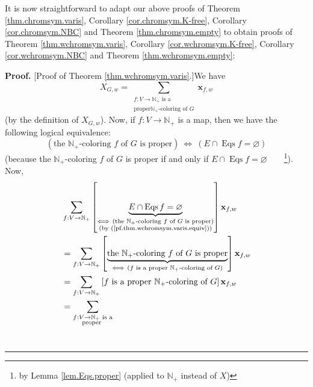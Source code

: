 \documentclass[numbers=enddot,12pt,final,onecolumn,notitlepage]{scrartcl}%
\theoremstyle{definition}
\newenvironment{proof}[1][Proof]{\noindent\textbf{#1.} }{\ \rule{0.5em}{0.5em}}
\newenvironment{verlong}{}{}
\let\sumnonlimits\sum
\renewcommand{\sum}{\sumnonlimits\limits}
\begin{document}
\begin{verlong}
It is now straightforward to adapt our above proofs of Theorem
\ref{thm.chromsym.varis}, Corollary \ref{cor.chromsym.K-free}, Corollary
\ref{cor.chromsym.NBC} and Theorem \ref{thm.chromsym.empty} to obtain proofs
of Theorem \ref{thm.wchromsym.varis}, Corollary \ref{cor.wchromsym.K-free},
Corollary \ref{cor.wchromsym.NBC} and Theorem \ref{thm.wchromsym.empty}:

\begin{proof}
[Proof of Theorem \ref{thm.wchromsym.varis}.]We have
\begin{equation}
X_{G,w}=\sum_{\substack{f:V\rightarrow\mathbb{N}_{+}\text{ is a}\\\text{proper
}\mathbb{N}_{+}\text{-coloring of }G}}\mathbf{x}_{f,w}
\label{pf.thm.wchromsym.varis.XG-def}%
\end{equation}
(by the definition of $X_{G,w}$). Now, if $f:V\rightarrow\mathbb{N}_{+}$ is a
map, then we have the following logical equivalence:%
\begin{equation}
\left(  \text{the }\mathbb{N}_{+}\text{-coloring }f\text{ of }G\text{ is
proper}\right)  \ \Longleftrightarrow\ \left(  E\cap\operatorname*{Eqs}%
f=\varnothing\right)  \label{pf.thm.wchromsym.varis.equiv}%
\end{equation}
(because the $\mathbb{N}_{+}$-coloring $f$ of $G$ is proper if and only if
$E\cap\operatorname*{Eqs}f=\varnothing$\ \ \ \ \footnote{by Lemma
\ref{lem.Eqs.proper} (applied to $\mathbb{N}_{+}$ instead of $X$)}). Now,%
\begin{align}
&  \sum_{f:V\rightarrow\mathbb{N}_{+}}\left[  \underbrace{E\cap
\operatorname*{Eqs}f=\varnothing}_{\substack{\Longleftrightarrow\ \left(
\text{the }\mathbb{N}_{+}\text{-coloring }f\text{ of }G\text{ is
proper}\right)  \\\text{(by (\ref{pf.thm.wchromsym.varis.equiv}))}}}\right]
\mathbf{x}_{f,w}\nonumber\\
&  =\sum_{f:V\rightarrow\mathbb{N}_{+}}\left[  \underbrace{\text{the
}\mathbb{N}_{+}\text{-coloring }f\text{ of }G\text{ is proper}}%
_{\Longleftrightarrow\ \left(  f\text{ is a proper }\mathbb{N}_{+}%
\text{-coloring of }G\right)  }\right]  \mathbf{x}_{f,w}\nonumber\\
&  =\sum_{f:V\rightarrow\mathbb{N}_{+}}\left[  f\text{ is a proper }%
\mathbb{N}_{+}\text{-coloring of }G\right]  \mathbf{x}_{f,w}\nonumber\\
&  =\sum_{\substack{f:V\rightarrow\mathbb{N}_{+}\text{ is a}\\\text{proper
}}}
\end{align}
\end{proof}
\end{verlong}
\end{document}
